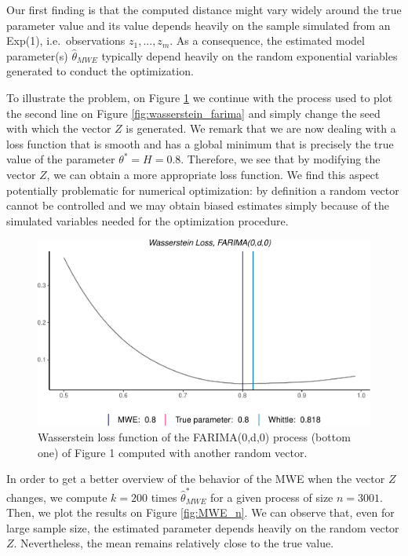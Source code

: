 \documentclass[
  11pt,
]{article}
\begin{document}
Our first finding is that the computed distance might vary widely around
the true parameter value and its value depends heavily on the sample
simulated from an Exp(1), i.e.~observations \(z_1, ..., z_m\). As a
consequence, the estimated model parameter(s) \(\hat \theta_{MWE}\)
typically depend heavily on the random exponential variables generated
to conduct the optimization.

To illustrate the problem, on Figure \ref{fig:wasserstein_z} we continue
with the process used to plot the second line on Figure
\ref{fig:wasserstein_farima} and simply change the seed with which the
vector \(Z\) is generated. We remark that we are now dealing with a loss
function that is smooth and has a global minimum that is precisely the
true value of the parameter \(\theta^* = H = 0.8\). Therefore, we see
that by modifying the vector \(Z\), we can obtain a more appropriate
loss function. We find this aspect potentially problematic for numerical
optimization: by definition a random vector cannot be controlled and we
may obtain biased estimates simply because of the simulated variables
needed for the optimization procedure.

\begin{figure}[h]

{\centering \includegraphics[width=0.55\linewidth]{Master_thesis_V2_files/figure-latex/wasserstein_z-1} 

}

\caption{Wasserstein loss function of the FARIMA(0,d,0) process (bottom one) of Figure 1 computed with another random vector.}\label{fig:wasserstein_z}
\end{figure}

In order to get a better overview of the behavior of the MWE when the
vector \(Z\) changes, we compute \(k = 200\) times
\(\hat \theta^*_{MWE}\) for a given process of size \(n = 3001\). Then,
we plot the results on Figure \ref{fig:MWE_n}. We can observe that, even
for large sample size, the estimated parameter depends heavily on the
random vector \(Z\). Nevertheless, the mean remains relatively close to
the true value.
\end{document}
